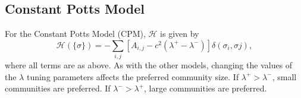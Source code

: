 \documentclass[11pt]{article}
\begin{document}
\subsection{Constant Potts Model}\label{appendix:CPModel}

For the Constant Potts Model (CPM), $\mathcal{H}$ is given by
\begin{equation}\label{eq:CNModel2}
\mathcal{H}(\{\sigma\}) = - \displaystyle\sum_{i,j} \left[A_{i,j} -  c^{2}\left(\lambda^{+} - \lambda^{-}\right)\right]\delta(\sigma_{i}, \sigma{j}),
\end{equation}
where all terms are as above. As with the other models, changing the values of the $\lambda$ tuning
parameters affects the preferred community size. If $\lambda^{+} > \lambda^{-}$, small communities are preferred. If $\lambda^{-} > \lambda^{+}$, large communities are preferred. \\


\newpage
\end{document}
